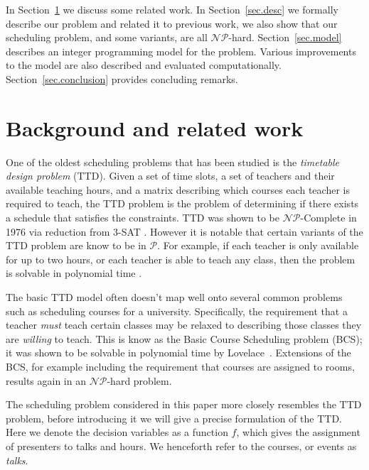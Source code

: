 \documentclass[]{article}
\theoremstyle{definition}
\theoremstyle{remark}
\numberwithin{equation}{section}
\newcommand{\cNP}{$\mathcal{NP}$}
\newcommand{\cP}{$\mathcal{P}$}
\begin{document}
In Section~\ref{sec.back} we discuss some related work.
In Section~\ref{sec.desc} we formally describe our problem and related it to previous work,
we also show that our scheduling problem, and some variants, are all \cNP-hard.
Section~\ref{sec.model} describes an integer programming model for the problem.
Various improvements to the model are also described and evaluated computationally.
Section~\ref{sec.conclusion} provides concluding remarks.

\section{Background and related work}\label{sec.back}

One of the oldest scheduling problems that has been studied is the \emph{timetable design problem} (TTD). 
Given a set of time slots, a set of teachers and their available teaching hours, and a matrix describing which courses each teacher is required to teach,  the TTD problem is the problem of determining if there exists a schedule that satisfies the constraints. 
TTD was shown to be \cNP-Complete in 1976 via reduction from 3-SAT \cite{even76}. 
However it is notable that certain variants of the TTD problem are know to be in \cP. 
For example, if each teacher is only available for up to two hours, or each teacher is able to teach any class, then the problem is solvable in polynomial time \cite{garey76}.

The basic TTD model often doesn't map well onto several common problems such as scheduling courses for a university. 
Specifically, the requirement that a teacher \emph{must} teach certain classes may be relaxed to describing those classes they are \emph{willing} to teach. 
This is know as the Basic Course Scheduling problem (BCS); it was shown to be solvable in polynomial time by Lovelace~\cite{lovelace2010}. 
Extensions of the BCS, for example including the requirement that courses are assigned to rooms, results again in an \cNP-hard problem.

The scheduling problem considered in this paper more closely resembles the TTD problem, before introducing it we will give a precise formulation of the TTD.
Here we denote the decision variables as a function $f$, which gives the assignment of presenters to talks and hours.
We henceforth refer to the courses, or events as \emph{talks}.
\end{document}
